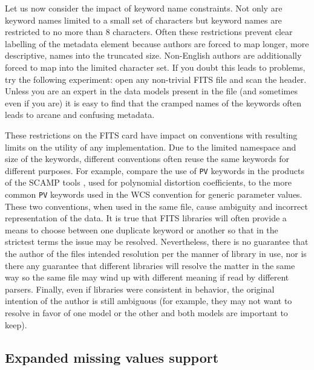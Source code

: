 \documentclass[final,authoryear,5p,times,twocolumn]{elsarticle}
\begin{document}
{{Let us now consider the impact of keyword name constraints. Not only
are keyword names limited to a small set of characters but keyword
names are restricted to no more than 8 characters. Often these
restrictions prevent clear labelling of the metadata element because
authors are forced to map longer, more descriptive, names into the
truncated size. Non-English authors are additionally forced to map
into the limited character set. If you doubt this leads to problems,
try the following experiment: open any non-trivial FITS file and scan
the header. Unless you are an expert in the data models present in the
file (and sometimes even if you are) it is easy to find that the
cramped names of the keywords often leads to arcane and confusing
metadata.


These restrictions on the FITS card have impact on conventions with
resulting limits on the utility of any implementation. Due to the limited
namespace and size of the keywords, different conventions often reuse
the same keywords for different purposes.  For example, compare the use
of \texttt{PV} keywords in the products of the SCAMP tools
\citep{2006ASPC..351..112B}, used for polynomial distortion coefficients,
to the more common \texttt{PV} keywords used in the WCS convention for generic
parameter values. 
These two conventions, when used in the same file, cause ambiguity and
incorrect representation of the data. It is true that FITS libraries
will often provide a means to choose between one duplicate keyword or another
so that in the strictest terms the issue may be resolved.
Nevertheless, there is no guarantee that the author of
the files intended resolution per the manner of library in use, nor is there any
guarantee that different libraries will resolve the matter in the same way
so the same file may wind up with different meaning if read by different parsers.
Finally, even if libraries were consistent in behavior, the original intention
of the author is still ambiguous (for example, they may not want to resolve
in favor of one model or the other and both models are important to keep).


\subsection{Expanded missing values support}

}}
\end{document}
